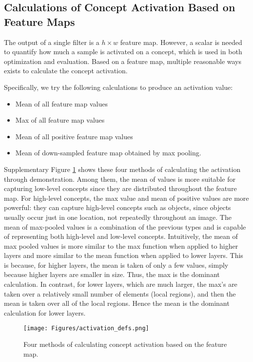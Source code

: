 \documentclass{article}
\begin{document}
\subsection{Calculations of Concept Activation Based on Feature Maps}
\label{sec:activation_defs}
The output of a single filter is a $h\times w$ feature map. However, a scalar is needed to quantify how much a sample is activated on a concept, which is used in both optimization and evaluation. Based on a feature map, multiple reasonable ways exists to calculate the concept activation.

Specifically, we try the following calculations to produce an activation value:
\begin{itemize}[topsep=0pt,noitemsep]
    \item Mean of all feature map values
    \item Max of all feature map values
    \item Mean of all positive feature map values
    \item Mean of down-sampled feature map obtained by max pooling.
\end{itemize}
Supplementary Figure  \ref{fig:activation_defs} shows these four methods of calculating the activation through demonstration. Among them, the mean of values is more suitable for capturing low-level concepts since they are distributed throughout the feature map. For high-level concepts, the max value and mean of positive values are more powerful: they can capture high-level concepts such as objects, since objects usually occur just in one location, not repeatedly throughout an image. The mean of max-pooled values is a combination of the previous types and is capable of representing both high-level and low-level concepts. Intuitively, the mean of max pooled values is more similar to the max function when applied to higher layers and more similar to the mean function when applied to lower layers. This is because, for higher layers, the mean is taken of only a few values, simply because higher layers are smaller in size. Thus, the max is the dominant calculation. In contrast, for lower layers, which are much larger, the max's are taken over a relatively small number of elements (local regions), and then the mean is taken over all of the local regions. Hence the mean is the dominant calculation for lower layers. 

\begin{figure}[htbp]
    \texttt{[image: Figures/activation\_defs.png]}
  \caption{Four methods of calculating concept activation based on the feature map.}
  \label{fig:activation_defs}
\end{figure}
\end{document}
